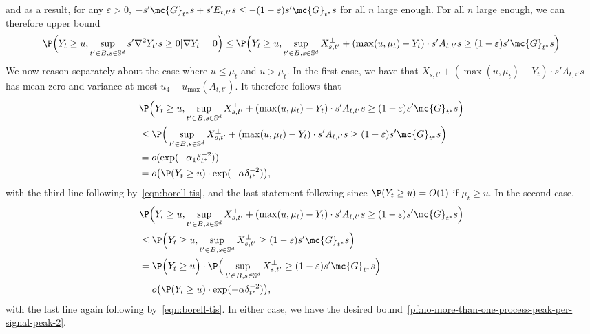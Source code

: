 \documentclass{article}
\begin{document}
	and as a result, for any $\varepsilon > 0$, $-s'\mc{G}_{t^{\ast}}s + s' E_{t,t'}s \leq -(1 - \varepsilon) s'\mc{G}_{t^{\ast}}s$ for all $n$ large enough. For all $n$ large enough, we can therefore upper bound
	$$
	\P\Big(Y_t \geq u, \sup_{t' \in B, s \in \mathbb{S}^{d}} s' \nabla^2 Y_{t'} s \geq 0|\nabla Y_t = 0\Big) \leq \P\Big(Y_t \geq u, \sup_{t' \in B, s \in \mathbb{S}^{d}} X_{s,t'}^{\perp} + (\max(u,\mu_t) - Y_{t}) \cdot s' A_{t,t'} s \geq (1 - \varepsilon) s'\mc{G}_{t^{\ast}} s \Big)
	$$
	We now reason separately about the case where $u \leq \mu_t$ and $u > \mu_t$. In the first case, we have that $X_{s,t'}^{\perp} + (\max(u,\mu_t) - Y_{t}) \cdot s' A_{t,t'} s$ has mean-zero and variance at most $u_4 + u_{\max}(A_{t,t'})$. It therefore follows that 
	\begin{align*}
		& \P\Big(Y_t \geq u, \sup_{t' \in B, s \in \mathbb{S}^{d}} X_{s,t'}^{\perp} + (\max(u,\mu_t) - Y_{t}) \cdot s' A_{t,t'} s \geq (1 - \varepsilon) s'\mc{G}_{t^{\ast}} s\Big) \\
		& \leq \P\Big(\sup_{t' \in B, s \in \mathbb{S}^{d}} X_{s,t'}^{\perp} + (\max(u,\mu_t) - Y_{t}) \cdot s' A_{t,t'} s \geq (1 - \varepsilon) s'\mc{G}_{t^{\ast}} s\Big) \\
		& = o(\exp(-\alpha_1 \delta_{t^{\ast}}^{-2})) \\
		& = o\big(\P(Y_t \geq u) \cdot \exp(-\alpha \delta_{t^{\ast}}^{-2})\big),
	\end{align*}
	with the third line following by~\eqref{eqn:borell-tis}, and the last statement following since $\P(Y_t \geq u) = O(1)$ if $\mu_t \geq u$. In the second case, 
	\begin{align*}
		& \P\Big(Y_t \geq u, \sup_{t' \in B, s \in \mathbb{S}^{d}} X_{s,t'}^{\perp} + (\max(u,\mu_t) - Y_{t}) \cdot s' A_{t,t'} s \geq (1 - \varepsilon) s'\mc{G}_{t^{\ast}} s\Big) \\
		& \leq \P\Big(Y_t \geq u, \sup_{t' \in B, s \in \mathbb{S}^{d}} X_{s,t'}^{\perp} \geq (1 - \varepsilon) s'\mc{G}_{t^{\ast}} s\Big) \\
		& = \P\Big(Y_t \geq u\Big) \cdot \P\Big(\sup_{t' \in B, s \in \mathbb{S}^{d}} X_{s,t'}^{\perp} \geq (1 - \varepsilon) s'\mc{G}_{t^{\ast}} s\Big) \\
		& = o\big(\P(Y_t \geq u) \cdot \exp(-\alpha \delta_{t^{\ast}}^{-2})\big),
	\end{align*}
	with the last line again following by~\eqref{eqn:borell-tis}. In either case, we have the desired bound~\eqref{pf:no-more-than-one-process-peak-per-signal-peak-2}.
	\fi
	
\end{document}
